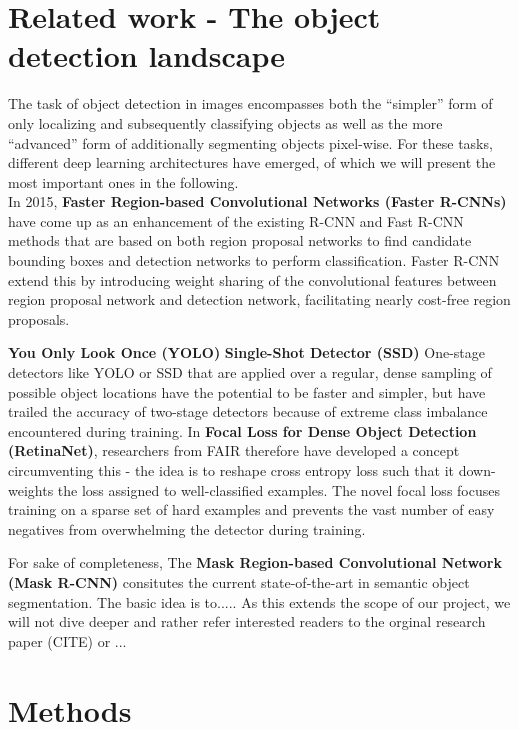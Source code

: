 \documentclass[a4paper]{article}
\begin{document}
\section{Related work - The object detection landscape}
The task of object detection in images encompasses both the ``simpler'' form of only localizing and subsequently classifying objects as well as the more ``advanced'' form of additionally segmenting objects pixel-wise. For these tasks, different deep learning architectures have emerged, of which we will present the most important ones in the following.\\ In 2015, \textbf{Faster Region-based Convolutional Networks (Faster R-CNNs)}\cite{DBLP:journals/corr/RenHG015} have come up as an enhancement of the existing R-CNN and Fast R-CNN methods that are based on both region proposal networks to find candidate bounding boxes and detection networks to perform classification. Faster R-CNN extend this by introducing weight sharing of the convolutional features between region proposal network and detection network, facilitating nearly cost-free region proposals. 

\textbf{You Only Look Once (YOLO)}
\textbf{Single-Shot Detector (SSD)}
One-stage detectors like YOLO or SSD that are applied over a regular, dense sampling of possible object locations have the potential to be faster and simpler, but have trailed the accuracy of two-stage detectors because of extreme class imbalance encountered during training.
In \textbf{Focal Loss for Dense Object Detection (RetinaNet)}, researchers from FAIR therefore have developed a concept circumventing this - the idea is to reshape cross entropy loss such that it down-weights the loss assigned to well-classified examples. The novel focal loss focuses training on a sparse set of hard examples and prevents the vast number of easy negatives from overwhelming the detector during training. 



For sake of completeness, The \textbf{Mask Region-based Convolutional Network (Mask R-CNN)} consitutes the current state-of-the-art in semantic object segmentation. The basic idea is to.....
As this extends the scope of our project, we will not dive deeper and rather refer interested readers to the orginal research paper (CITE) or ...
\section{Methods}
\end{document}
